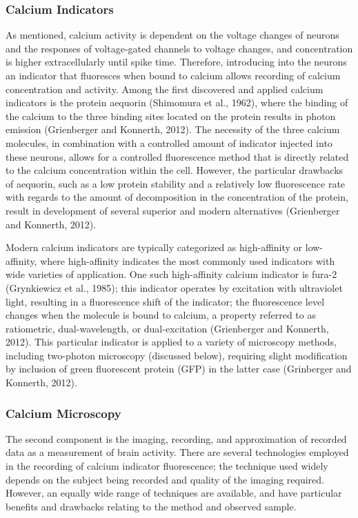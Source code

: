 \documentclass[11pt]{article}
\begin{document}
\subsubsection{Calcium Indicators}
As mentioned, calcium activity is dependent on the voltage changes of neurons and the responses of voltage-gated channels to voltage changes, and concentration is higher extracellularly until spike time. Therefore, introducing into the neurons an indicator that fluoresces when bound to calcium allows recording of calcium concentration and activity. Among the first discovered and applied calcium indicators is the protein aequorin (Shimomura et al., 1962), where the binding of the calcium to the three binding sites located on the protein results in photon emission (Grienberger and Konnerth, 2012). The necessity of the three calcium molecules, in combination with a controlled amount of indicator injected into these neurons, allows for a controlled fluorescence method that is directly related to the calcium concentration within the cell. However, the particular drawbacks of aequorin, such as a low protein stability and a relatively low fluorescence rate with regards to the amount of decomposition in the concentration of the protein, result in development of several superior and modern alternatives (Grienberger and Konnerth, 2012).\par

Modern calcium indicators are typically categorized as high-affinity or low-affinity, where high-affinity indicates the most commonly used indicators with wide varieties of application. One such high-affinity calcium indicator is fura-2 (Grynkiewicz et al., 1985); this indicator operates by excitation with ultraviolet light, resulting in a fluorescence shift of the indicator; the fluorescence level changes when the molecule is bound to calcium, a property referred to as ratiometric, dual-wavelength, or dual-excitation (Grienberger and Konnerth, 2012). This particular indicator is applied to a variety of microscopy methods, including two-photon microscopy (discussed below), requiring slight modification by inclusion of green fluorescent protein (GFP) in the latter case (Grinberger and Konnerth, 2012). 

\subsubsection{Calcium Microscopy}
The second component is the imaging, recording, and approximation of recorded data as a measurement of brain activity. There are several technologies employed in the recording of calcium indicator fluorescence; the technique used widely depends on the subject being recorded and quality of the imaging required. However, an equally wide range of techniques are available, and have particular benefits and drawbacks relating to the method and observed sample.\par
\end{document}
